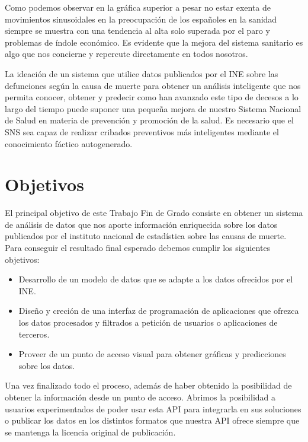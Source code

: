 Como podemos observar en la gráfica superior a pesar no estar exenta de movimientos sinusoidales 
en la preocupación de los españoles en la sanidad siempre se muestra con una tendencia al alta 
solo superada por el paro y problemas de índole económico. 
Es evidente que la mejora del sistema sanitario es algo que nos concierne y repercute 
directamente en todos nosotros.

La ideación de un sistema que utilice datos publicados por el INE sobre las defunciones según 
la causa de muerte para obtener un análisis inteligente que nos permita conocer, obtener y predecir
como han avanzado este tipo de decesos a lo largo del tiempo puede suponer una pequeña mejora de 
nuestro Sistema Nacional de Salud en materia de prevención y promoción de la salud. Es necesario que el 
SNS sea capaz de realizar cribados preventivos más inteligentes mediante el conocimiento fáctico autogenerado.

\section{Objetivos}
El principal objetivo de este Trabajo Fin de Grado consiste en obtener un sistema de análisis de datos que nos aporte
información enriquecida sobre los datos publicados por el instituto nacional de estadística sobre las causas de muerte. 
Para conseguir el resultado final esperado debemos cumplir los siguientes objetivos:
\begin{itemize}
    \item Desarrollo de un modelo de datos que se adapte a los datos ofrecidos por el INE.
    \item Diseño y creción de una interfaz de programación de aplicaciones que ofrezca los datos procesados y 
filtrados a petición de usuarios o aplicaciones de terceros.
    \item Proveer de un punto de acceso visual para obtener gráficas y predicciones sobre los datos.
\end{itemize}

Una vez finalizado todo el proceso, además de haber obtenido la posibilidad de obtener la información 
desde un punto de acceso. Abrimos la posibilidad a usuarios experimentados de poder usar esta API para 
integrarla en sus soluciones o publicar los datos en los distintos formatos que nuestra API ofrece 
siempre que se mantenga la licencia original de publicación.


